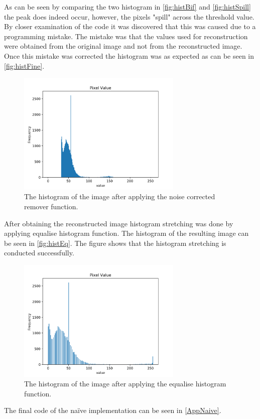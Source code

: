 \noindent
As can be seen by comparing the two histogram in \autoref{fig:histBif} and \autoref{fig:histSpill} the peak does indeed occur, however, the pixels "spill" across the threshold value. By closer examination of the code it was discovered that this was caused due to a programming mistake. The mistake was that the values used for reconstruction were obtained from the original image and not from the reconstructed image. Once this mistake was corrected the histogram was as expected as can be seen in \autoref{fig:histFine}. 
\begin{figure}[h]
\centering
\includegraphics[width=0.7\textwidth]{figures/hist_nicespacing.png}
\caption{The histogram of the image after applying the noise corrected remover function.}
\label{fig:histFine}
\end{figure}
\noindent
After obtaining the reconstructed image histogram stretching was done by applying equalise histogram function. The histogram of the resulting image can be seen in \autoref{fig:histEq}. The figure shows that the histogram stretching is conducted successfully. 
\begin{figure}[h]
\centering
\includegraphics[width=0.7\textwidth]{figures/hist_equal.png}
\caption{The histogram of the image after applying the equalise histogram function.}
\label{fig:histEq}
\end{figure}
\noindent
The final code of the na\"ive implementation can be seen in \autoref{AppNaive}.